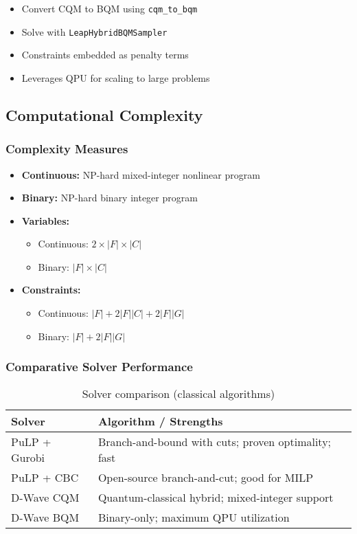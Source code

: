 \documentclass[11pt,a4paper]{article}
\begin{document}
\begin{itemize}
    \item Convert CQM to BQM using \texttt{cqm\_to\_bqm}
    \item Solve with \texttt{LeapHybridBQMSampler}
    \item Constraints embedded as penalty terms
    \item Leverages QPU for scaling to large problems
\end{itemize}

\subsection{Computational Complexity}

\subsubsection{Complexity Measures}

\begin{itemize}
    \item \textbf{Continuous:} NP-hard mixed-integer nonlinear program
    \item \textbf{Binary:} NP-hard binary integer program
    \item \textbf{Variables:}
    \begin{itemize}
        \item Continuous: $2 \times |F| \times |C|$
        \item Binary: $|F| \times |C|$
    \end{itemize}
    \item \textbf{Constraints:}
    \begin{itemize}
        \item Continuous: $|F| + 2|F||C| + 2|F||G|$
        \item Binary: $|F| + 2|F||G|$
    \end{itemize}
\end{itemize}

\subsubsection{Comparative Solver Performance}

\begin{table}[h]
\centering
\caption{Solver comparison (classical algorithms)}
\begin{tabular}{ll}
\toprule
\textbf{Solver} & \textbf{Algorithm / Strengths} \\
\midrule
PuLP + Gurobi & Branch-and-bound with cuts; proven optimality; fast \\
PuLP + CBC & Open-source branch-and-cut; good for MILP \\
D-Wave CQM & Quantum-classical hybrid; mixed-integer support \\
D-Wave BQM & Binary-only; maximum QPU utilization \\
\bottomrule
\end{tabular}
\end{table}
\end{document}
